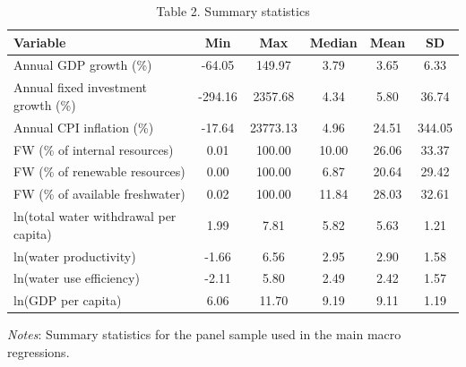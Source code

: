 \begin{table}[htbp]
\centering
\caption{Table 2. Summary statistics}
\small
\begin{tabular}{lccccc}
\hline
Variable & Min & Max & Median & Mean & SD \\
\hline
Annual GDP growth (\%) & -64.05 & 149.97 & 3.79 & 3.65 & 6.33 \\
Annual fixed investment growth (\%) & -294.16 & 2357.68 & 4.34 & 5.80 & 36.74 \\
Annual CPI inflation (\%) & -17.64 & 23773.13 & 4.96 & 24.51 & 344.05 \\
FW (\% of internal resources) & 0.01 & 100.00 & 10.00 & 26.06 & 33.37 \\
FW (\% of renewable resources) & 0.00 & 100.00 & 6.87 & 20.64 & 29.42 \\
FW (\% of available freshwater) & 0.02 & 100.00 & 11.84 & 28.03 & 32.61 \\
ln(total water withdrawal per capita) & 1.99 & 7.81 & 5.82 & 5.63 & 1.21 \\
ln(water productivity) & -1.66 & 6.56 & 2.95 & 2.90 & 1.58 \\
ln(water use efficiency) & -2.11 & 5.80 & 2.49 & 2.42 & 1.57 \\
ln(GDP per capita) & 6.06 & 11.70 & 9.19 & 9.11 & 1.19 \\
\hline
\end{tabular}
\vspace{0.5em}
\parbox{0.95\textwidth}{\footnotesize \textit{Notes}: Summary statistics for the panel sample used in the main macro regressions.}
\end{table}
